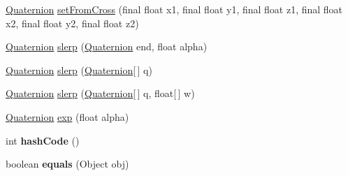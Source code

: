 \begin{DoxyCompactItemize}
\item 
\hyperlink{classairhockeyjava_1_1util_1_1_quaternion}{Quaternion} \hyperlink{classairhockeyjava_1_1util_1_1_quaternion_a73d5fed042613ad68e47900db9254cdc}{set\+From\+Cross} (final float x1, final float y1, final float z1, final float x2, final float y2, final float z2)
\item 
\hyperlink{classairhockeyjava_1_1util_1_1_quaternion}{Quaternion} \hyperlink{classairhockeyjava_1_1util_1_1_quaternion_a6e8403e9cba31b0f667948c9f4db3dab}{slerp} (\hyperlink{classairhockeyjava_1_1util_1_1_quaternion}{Quaternion} end, float alpha)
\item 
\hyperlink{classairhockeyjava_1_1util_1_1_quaternion}{Quaternion} \hyperlink{classairhockeyjava_1_1util_1_1_quaternion_ab3523697de9c52750f14a43e11e3976c}{slerp} (\hyperlink{classairhockeyjava_1_1util_1_1_quaternion}{Quaternion}\mbox{[}$\,$\mbox{]} q)
\item 
\hyperlink{classairhockeyjava_1_1util_1_1_quaternion}{Quaternion} \hyperlink{classairhockeyjava_1_1util_1_1_quaternion_a5f6253934931302f6fc9d9a27a5d3942}{slerp} (\hyperlink{classairhockeyjava_1_1util_1_1_quaternion}{Quaternion}\mbox{[}$\,$\mbox{]} q, float\mbox{[}$\,$\mbox{]} w)
\item 
\hyperlink{classairhockeyjava_1_1util_1_1_quaternion}{Quaternion} \hyperlink{classairhockeyjava_1_1util_1_1_quaternion_a5f38188af9e77bc4cbbc4482843e0f24}{exp} (float alpha)
\item 
\hypertarget{classairhockeyjava_1_1util_1_1_quaternion_adc714302ae474676868289baeb538b72}{}int {\bfseries hash\+Code} ()\label{classairhockeyjava_1_1util_1_1_quaternion_adc714302ae474676868289baeb538b72}

\item 
\hypertarget{classairhockeyjava_1_1util_1_1_quaternion_aa9b36e5847e75c15dff06b5c2c15d243}{}boolean {\bfseries equals} (Object obj)\label{classairhockeyjava_1_1util_1_1_quaternion_aa9b36e5847e75c15dff06b5c2c15d243}


\end{DoxyCompactItemize}

